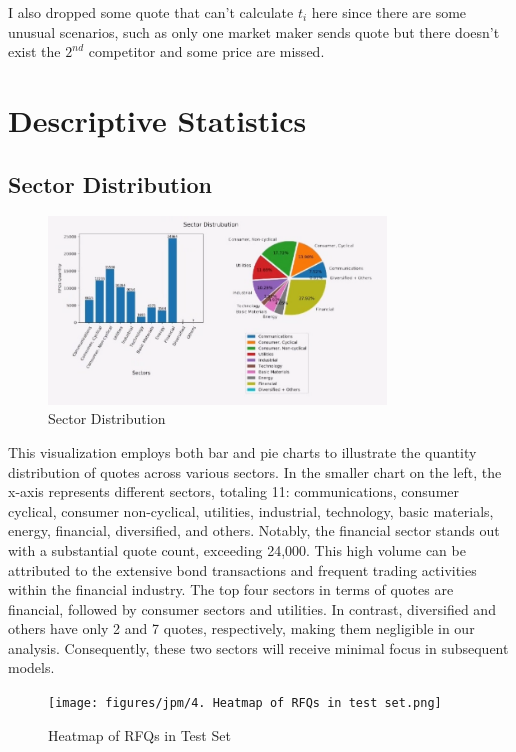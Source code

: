 I also dropped some quote that can't calculate $t_i$ here since there are some unusual scenarios, such as only one market maker sends quote but there doesn't exist the $2^{nd}$ competitor and some price are missed.

\section{Descriptive Statistics}
\subsection{Sector Distribution}
\begin{figure}[ht]
    \centering
    \includegraphics[width=0.8\textwidth]{figures/jpm/1. Sector Distribution.png}
    \caption{Sector Distribution}
    \label{fig:sector_distribution}
\end{figure}

This visualization employs both bar and pie charts to illustrate the quantity distribution of quotes across various sectors. In the smaller chart on the left, the x-axis represents different sectors, totaling 11: communications, consumer cyclical, consumer non-cyclical, utilities, industrial, technology, basic materials, energy, financial, diversified, and others. Notably, the financial sector stands out with a substantial quote count, exceeding 24,000. This high volume can be attributed to the extensive bond transactions and frequent trading activities within the financial industry. The top four sectors in terms of quotes are financial, followed by consumer sectors and utilities. In contrast, diversified and others have only 2 and 7 quotes, respectively, making them negligible in our analysis. Consequently, these two sectors will receive minimal focus in subsequent models.

\begin{figure}[H]
    \centering
    \texttt{[image: figures/jpm/4. Heatmap of RFQs in test set.png]}
    \caption{Heatmap of RFQs in Test Set}
    \label{fig:rfqs_heatmap_test}
\end{figure}

